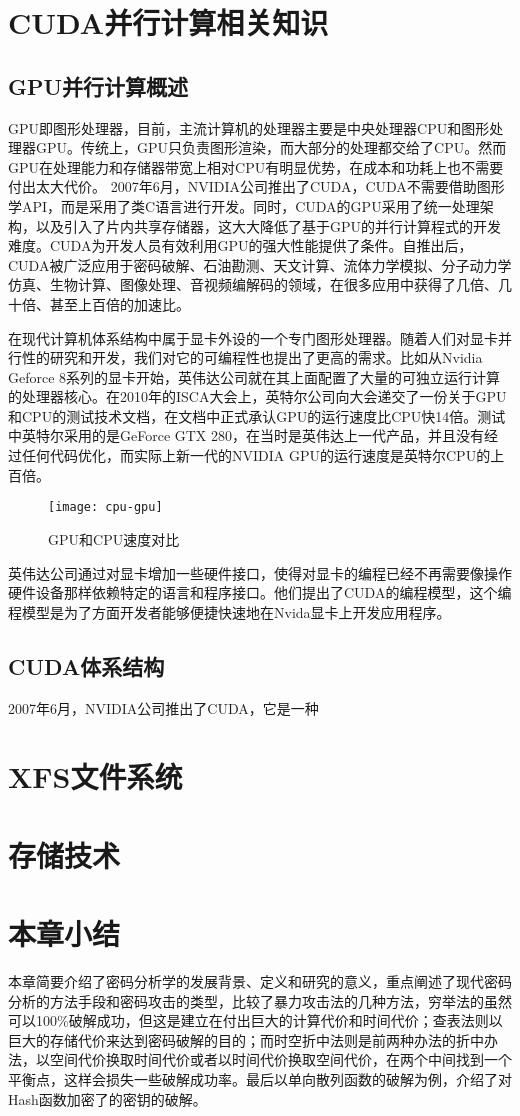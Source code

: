 \section{CUDA并行计算相关知识}
\subsection{GPU并行计算概述}
GPU即图形处理器，目前，主流计算机的处理器主要是中央处理器CPU和图形处理器GPU。传统上，GPU只负责图形渲染，而大部分的处理都交给了CPU。然而GPU在处理能力和存储器带宽上相对CPU有明显优势，在成本和功耗上也不需要付出太大代价。
2007年6月，NVIDIA公司推出了CUDA，CUDA不需要借助图形学API，而是采用了类C语言进行开发。同时，CUDA的GPU采用了统一处理架构，以及引入了片内共享存储器，这大大降低了基于GPU的并行计算程式的开发难度。CUDA为开发人员有效利用GPU的强大性能提供了条件。自推出后，CUDA被广泛应用于密码破解、石油勘测、天文计算、流体力学模拟、分子动力学仿真、生物计算、图像处理、音视频编解码的领域，在很多应用中获得了几倍、几十倍、甚至上百倍的加速比。

在现代计算机体系结构中属于显卡外设的一个专门图形处理器。随着人们对显卡并行性的研究和开发，我们对它的可编程性也提出了更高的需求。比如从Nvidia Geforce 8系列的显卡开始，英伟达公司就在其上面配置了大量的可独立运行计算的处理器核心。在2010年的ISCA大会上，英特尔公司向大会递交了一份关于GPU和CPU的测试技术文档，在文档中正式承认GPU的运行速度比CPU快14倍\cite{intel}。测试中英特尔采用的是GeForce GTX 280，在当时是英伟达上一代产品，并且没有经过任何代码优化，而实际上新一代的NVIDIA GPU的运行速度是英特尔CPU的上百倍。
\begin{figure}[!ht]
\centering
\texttt{[image: cpu-gpu]}
\caption{GPU和CPU速度对比}
\label{fig:2.1}
\end{figure}

英伟达公司通过对显卡增加一些硬件接口，使得对显卡的编程已经不再需要像操作硬件设备那样依赖特定的语言和程序接口。他们提出了CUDA的编程模型，这个编程模型是为了方面开发者能够便捷快速地在Nvida显卡上开发应用程序。
\subsection{CUDA体系结构}
2007年6月，NVIDIA公司推出了CUDA\cite{nvidia}，它是一种
\section{XFS文件系统}
\section{存储技术}
\section{本章小结}
本章简要介绍了密码分析学的发展背景、定义和研究的意义，重点阐述了现代密码分析的方法手段和密码攻击的类型，比较了暴力攻击法的几种方法，穷举法的虽然可以100\%破解成功，但这是建立在付出巨大的计算代价和时间代价；查表法则以巨大的存储代价来达到密码破解的目的；而时空折中法则是前两种办法的折中办法，以空间代价换取时间代价或者以时间代价换取空间代价，在两个中间找到一个平衡点，这样会损失一些破解成功率。最后以单向散列函数的破解为例，介绍了对Hash函数加密了的密钥的破解。
